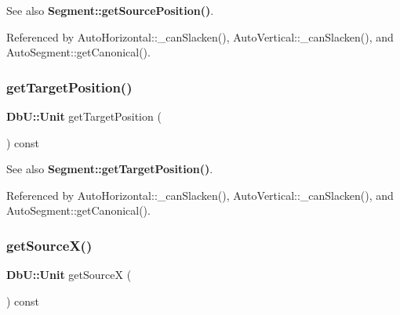 \begin{DoxySeeAlso}{See also}
\textbf{ Segment\+::get\+Source\+Position()}. 
\end{DoxySeeAlso}


Referenced by Auto\+Horizontal\+::\+\_\+can\+Slacken(), Auto\+Vertical\+::\+\_\+can\+Slacken(), and Auto\+Segment\+::get\+Canonical().

\mbox{\label{classKatabatic_1_1AutoSegment_a65dea76b4efad9d3caa78be44e96c94c}} 
\subsubsection{\texorpdfstring{get\+Target\+Position()}{getTargetPosition()}}
{\footnotesize\ttfamily \textbf{ Db\+U\+::\+Unit} get\+Target\+Position (\begin{DoxyParamCaption}{ }\end{DoxyParamCaption}) const\hspace{0.3cm}{\ttfamily [inline]}}

\begin{DoxySeeAlso}{See also}
\textbf{ Segment\+::get\+Target\+Position()}. 
\end{DoxySeeAlso}


Referenced by Auto\+Horizontal\+::\+\_\+can\+Slacken(), Auto\+Vertical\+::\+\_\+can\+Slacken(), and Auto\+Segment\+::get\+Canonical().

\mbox{\label{classKatabatic_1_1AutoSegment_a8a8e127557d70de70f9efb488be30d1a}} 
\subsubsection{\texorpdfstring{get\+Source\+X()}{getSourceX()}}
{\footnotesize\ttfamily \textbf{ Db\+U\+::\+Unit} get\+SourceX (\begin{DoxyParamCaption}{ }\end{DoxyParamCaption}) const\hspace{0.3cm}{\ttfamily [inline]}}

